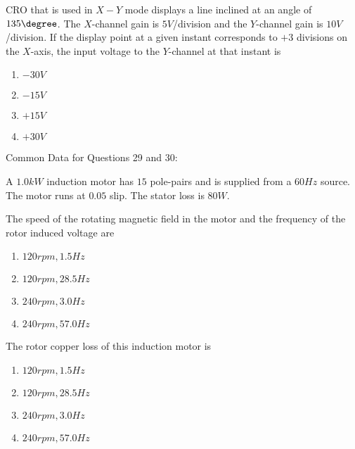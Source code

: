     \item CRO that is used in $X-Y$ mode displays a line inclined at an angle of $135\degree$. The $X$-channel gain is $5V$/division and the $Y$-channel gain is $10V$/division. If the display point at a given instant corresponds to $+3$ divisions on the $X$-axis, the input voltage to the $Y$-channel at that instant is 
        \begin{enumerate}
            \item $-30V$
            \item $-15V$
            \item $+15V$
            \item $+30V$
        \end{enumerate}


Common Data for Questions 29 and 30:

A $1.0kW$ induction motor has $15$ pole-pairs and is supplied from a $60Hz$ source. The motor runs at $0.05$ slip. The stator loss is $80W$.
    
    \item The speed of the rotating magnetic field in the motor and the frequency of the rotor induced voltage are
        \begin{enumerate}
            \item $120rpm, 1.5Hz$
            \item $120rpm, 28.5Hz$
            \item $240rpm, 3.0Hz$
            \item $240rpm, 57.0Hz$
        \end{enumerate}

    \item The rotor copper loss of this induction motor is
        \begin{enumerate}
            \item $120rpm, 1.5Hz$
            \item $120rpm, 28.5Hz$
            \item $240rpm, 3.0Hz$
            \item $240rpm, 57.0Hz$
        \end{enumerate}


